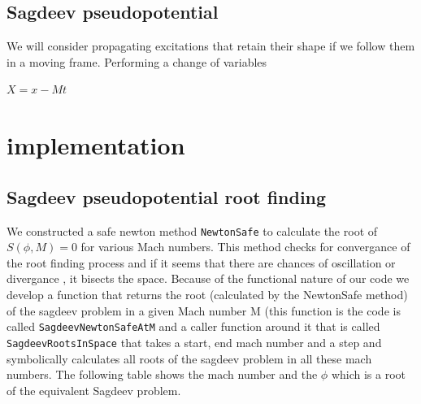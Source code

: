 \documentclass{report}
\newcommand{\bmathc}{\begin{center}\begin{math}}
\newcommand{\emathc}{\end{math}\end{center}}
\begin{document}
\subsection{Sagdeev pseudopotential}
We will consider propagating excitations that retain their shape if we follow them in a moving frame.
Performing a change of variables 
\bmathc
	X = x - M t
\emathc

\section{implementation}
\subsection{Sagdeev pseudopotential root finding}
We constructed a safe newton method {\tt NewtonSafe} to calculate the root of $S(\phi, M) = 0$
for various Mach numbers. This method checks for convergance of the root finding process and
if it seems that there are chances of oscillation or divergance , it bisects the space.
Because of the functional nature of our code we develop a function that returns the root
(calculated by the NewtonSafe method) of the sagdeev problem in a given Mach number M
(this function is the code is called {\tt SagdeevNewtonSafeAtM} and a caller function around it
that is called {\tt SagdeevRootsInSpace} that takes a start, end mach number and a step and 
symbolically calculates all roots of the sagdeev problem in all these mach numbers. The following
table shows the mach number and the $\phi$ which is a root of the equivalent Sagdeev problem.
\end{document}
